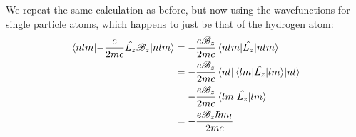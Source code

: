 \documentclass[10pt]{article}
\begin{document}
\begin{enumerate}[label=\alph*)]
						\begin{solution}
								We repeat the same calculation as before, but now using the wavefunctions for 
								single particle atoms, which happens to just be that of the hydrogen atom:
								\begin{align*}
										\expval{-\frac{e}{2mc}\hat{L_z}\mathscr B_z}{nlm} &= 
										-\frac{e\mathscr B_z}{2mc}\expval{\hat{L_z}}{nlm}  \\
										&= -\frac{e\mathscr B_z}{2mc}\expval{\expval{\hat{L_z}}{lm}}{nl} \\
										&= -\frac{e\mathscr B_z}{2mc}\expval{\hat{L_z}}{lm} \\
										&= -\frac{e\mathscr B_z \hbar m_l}{2mc} 
								\end{align*}
						\end{solution}
		\end{enumerate}


		
\end{document}
